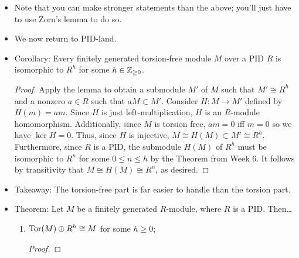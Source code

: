 \documentclass[../notes.tex]{subfiles}
\begin{document}
\begin{itemize}
\begin{enumerate}[label={(\roman*)}]
\begin{proof}
            \begin{equation*}
                aM = a\left( \sum_{s\in S}As \right)
                \subset M'
            \end{equation*}
            as desired.
        \end{proof}
    \end{enumerate}
    \item Note that you can make stronger statements than the above; you'll just have to use Zorn's lemma to do so.
    \item We now return to PID-land.
    \item Corollary: Every finitely generated torsion-free module $M$ over a PID $R$ is isomorphic to $R^h$ for some $h\in{\mathbb{Z}_{\geq 0}}$.
    \begin{proof}

        Apply the lemma to obtain a submodule $M'$ of $M$ such that $M'\cong R^h$ and a nonzero $a\in R$ such that $aM\subset M'$. Consider $H:M\to M'$ defined by $H(m)=am$. Since $H$ is just left-multiplication, $H$ is an $R$-module homomorphism. Additionally, since $M$ is torsion free, $am=0$ iff $m=0$ so we have $\ker H=0$. Thus, since $H$ is injective, $M\cong H(M)\subset M'\cong R^h$. Furthermore, since $R$ is a PID, the submodule $H(M)$ of $R^h$ must be isomorphic to $R^n$ for some $0\leq n\leq h$ by the Theorem from Week 6. It follows by transitivity that $M\cong H(M)\cong R^n$, as desired.
    \end{proof}
    \item Takeaway: The torsion-free part is far easier to handle than the torsion part.
    \item Theorem: Let $M$ be a finitely generated $R$-module, where $R$ is a PID. Then\dots
    \begin{enumerate}[label={(\roman*)}]
        \item $\operatorname{Tor}(M)\oplus R^h\cong M$ for some $h\geq 0$;
        \begin{proof}


\end{proof}
\end{enumerate}
\end{itemize}
\end{document}
